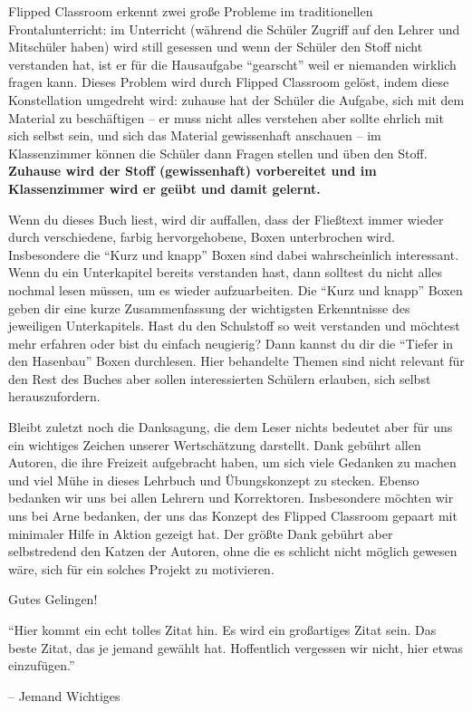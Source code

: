 \documentclass[../main.tex]{subfiles}
\begin{document}
Flipped Classroom erkennt zwei große Probleme im traditionellen Frontalunterricht: im Unterricht (während die Schüler Zugriff auf den Lehrer und Mitschüler haben) wird still gesessen und wenn der Schüler den Stoff nicht verstanden hat, ist er für die Hausaufgabe \enquote{gearscht} weil er niemanden wirklich fragen kann.
Dieses Problem wird durch Flipped Classroom gelöst, indem diese Konstellation umgedreht wird: zuhause hat der Schüler die Aufgabe, sich mit dem Material zu beschäftigen -- er muss nicht alles verstehen aber sollte ehrlich mit sich selbst sein, und sich das Material gewissenhaft anschauen -- im Klassenzimmer können die Schüler dann Fragen stellen und üben den Stoff. \textbf{Zuhause wird der Stoff (gewissenhaft) vorbereitet und im Klassenzimmer wird er geübt und damit gelernt.}

Wenn du dieses Buch liest, wird dir auffallen, dass der Fließtext immer wieder durch verschiedene, farbig hervorgehobene, Boxen unterbrochen wird. Insbesondere die \enquote{Kurz und knapp} Boxen sind dabei wahrscheinlich interessant. Wenn du ein Unterkapitel bereits verstanden hast, dann solltest du nicht alles nochmal lesen müssen, um es wieder aufzuarbeiten. Die \enquote{Kurz und knapp} Boxen geben dir eine kurze Zusammenfassung der wichtigsten Erkenntnisse des jeweiligen Unterkapitels. Hast du den Schulstoff so weit verstanden und möchtest mehr erfahren oder bist du einfach neugierig? Dann kannst du dir die \enquote{Tiefer in den Hasenbau} Boxen durchlesen. Hier behandelte Themen sind nicht relevant für den Rest des Buches aber sollen interessierten Schülern erlauben, sich selbst herauszufordern.

Bleibt zuletzt noch die Danksagung, die dem Leser nichts bedeutet aber für uns ein wichtiges Zeichen unserer Wertschätzung darstellt.
Dank gebührt allen Autoren, die ihre Freizeit aufgebracht haben, um sich viele Gedanken zu machen und viel Mühe in dieses Lehrbuch und Übungskonzept zu stecken. Ebenso bedanken wir uns bei allen Lehrern und Korrektoren. Insbesondere möchten wir uns bei Arne bedanken, der uns das Konzept des Flipped Classroom gepaart mit minimaler Hilfe in Aktion gezeigt hat. Der größte Dank gebührt aber selbstredend den Katzen der Autoren, ohne die es schlicht nicht möglich gewesen wäre, sich für ein solches Projekt zu motivieren.

{\hfill \Large Gutes Gelingen!}

\bigskip
\epigraph{\enquote{Hier kommt ein echt tolles Zitat hin. Es wird ein großartiges Zitat sein. Das beste Zitat, das je jemand gewählt hat. Hoffentlich vergessen wir nicht, hier etwas einzufügen.}}{-- Jemand Wichtiges}
\end{document}
